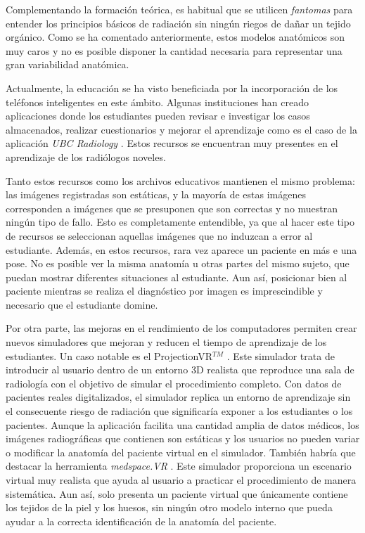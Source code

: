 Complementando la formación teórica, es habitual que se utilicen \emph{fantomas} para entender los principios básicos de radiación sin ningún riegos de dañar un tejido orgánico. Como se ha comentado anteriormente, estos modelos anatómicos son muy caros y no es posible disponer la cantidad necesaria para representar una gran variabilidad anatómica.

Actualmente, la educación se ha visto beneficiada por la incorporación de los teléfonos inteligentes en este ámbito. Algunas instituciones han creado aplicaciones donde los estudiantes pueden revisar e investigar los casos almacenados, realizar cuestionarios y mejorar el aprendizaje como es el caso de la aplicación \emph{UBC Radiology} \cite{Spouge2017}. Estos recursos se encuentran muy presentes en el aprendizaje de los radiólogos noveles.

Tanto estos recursos como los archivos educativos mantienen el mismo problema: las imágenes registradas son estáticas, y la mayoría de estas imágenes corresponden a imágenes que se presuponen que son correctas y no muestran ningún tipo de fallo. Esto es completamente entendible, ya que al hacer este tipo de recursos se seleccionan aquellas imágenes que no induzcan a error al estudiante. Además, en estos recursos, rara vez aparece un paciente en más e una pose. No es posible ver la misma anatomía u otras partes del mismo sujeto, que puedan mostrar diferentes situaciones al estudiante. Aun así, posicionar bien al paciente mientras se realiza el diagnóstico por imagen es imprescindible y necesario que el estudiante domine. 


Por otra parte, las mejoras en el rendimiento de los computadores permiten crear nuevos simuladores que mejoran y reducen el tiempo de aprendizaje de los estudiantes. Un caso notable es el  ProjectionVR$^{TM}$ \cite{shanahan2016student}. Este simulador trata de introducir al usuario dentro de un entorno 3D realista que reproduce una sala de radiología con el objetivo de simular el procedimiento completo. Con datos de pacientes reales digitalizados, el simulador replica un entorno de aprendizaje sin el consecuente riesgo de radiación que significaría exponer a los estudiantes o los pacientes. Aunque la aplicación facilita una cantidad amplia de datos médicos, los imágenes radiográficas que contienen son estáticas y los usuarios no pueden variar o modificar la anatomía del paciente virtual en el simulador. También habría que destacar la herramienta \emph{medspace.VR} \cite{medspace}. Este simulador proporciona un escenario virtual muy realista que ayuda al usuario a practicar el procedimiento de manera sistemática. Aun así, solo presenta un paciente virtual que únicamente contiene los tejidos de la piel y los huesos, sin ningún otro modelo interno que pueda ayudar a la correcta identificación de la anatomía del paciente.


